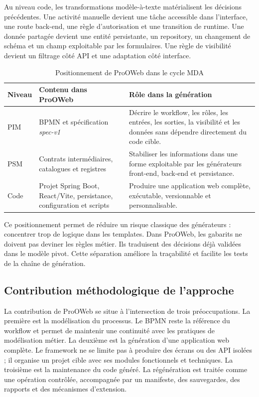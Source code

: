 Au niveau code, les transformations modèle-à-texte matérialisent les décisions précédentes. Une activité manuelle devient une tâche accessible dans l'interface, une route back-end, une règle d'autorisation et une transition de runtime. Une donnée partagée devient une entité persistante, un repository, un changement de schéma et un champ exploitable par les formulaires. Une règle de visibilité devient un filtrage côté API et une adaptation côté interface.

\begin{table}[H]
\centering
\small
\caption{Positionnement de ProOWeb dans le cycle MDA}
\label{tab:chap3-positionnement-mda}
\begin{tabular}{p{3.2cm}p{5.2cm}p{5.4cm}}
\hline
\textbf{Niveau} & \textbf{Contenu dans ProOWeb} & \textbf{Rôle dans la génération} \\
\hline
PIM & BPMN et spécification \textit{spec-v1} & Décrire le workflow, les rôles, les entrées, les sorties, la visibilité et les données sans dépendre directement du code cible. \\
PSM & Contrats intermédiaires, catalogues et registres & Stabiliser les informations dans une forme exploitable par les générateurs front-end, back-end et persistance. \\
Code & Projet Spring Boot, React/Vite, persistance, configuration et scripts & Produire une application web complète, exécutable, versionnable et personnalisable. \\
\hline
\end{tabular}
\end{table}

Ce positionnement permet de réduire un risque classique des générateurs : concentrer trop de logique dans les templates. Dans ProOWeb, les gabarits ne doivent pas deviner les règles métier. Ils traduisent des décisions déjà validées dans le modèle pivot. Cette séparation améliore la traçabilité et facilite les tests de la chaîne de génération.

\subsection{Contribution méthodologique de l'approche}

La contribution de ProOWeb se situe à l'intersection de trois préoccupations. La première est la modélisation du processus. Le BPMN reste la référence du workflow et permet de maintenir une continuité avec les pratiques de modélisation métier. La deuxième est la génération d'une application web complète. Le framework ne se limite pas à produire des écrans ou des API isolées ; il organise un projet cible avec ses modules fonctionnels et techniques. La troisième est la maintenance du code généré. La régénération est traitée comme une opération contrôlée, accompagnée par un manifeste, des sauvegardes, des rapports et des mécanismes d'extension.

